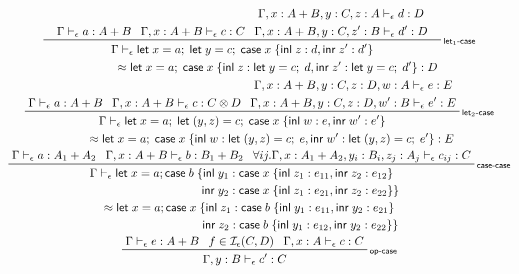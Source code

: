 \documentclass[acmsmall,screen,review]{acmart}
\newcommand{\mc}[1]{\ensuremath{\mathcal{#1}}}
\newcommand{\ms}[1]{\ensuremath{\mathsf{#1}}}
\newcommand{\lto}{:}
\newcommand{\linl}[1]{\ms{inl}\;{#1}}
\newcommand{\linr}[1]{\ms{inr}\;{#1}}
\newcommand{\letexpr}[3]{\ensuremath{\ms{let}\;#1 = #2;\;#3}}
\newcommand{\caseexpr}[5]{\ms{case}\;#1\;\{\linl{#2} \lto #3, \linr{#4} \lto #5\}}
\newcommand{\bhyp}[2]{#1 : #2}
\newcommand{\rle}[1]{{\scriptsize\textsf{#1}}}
\newcommand{\hasty}[4]{#1 \vdash_{#2} #3: {#4}}
\newcommand{\isop}[4]{#1 \in \mc{I}_{#4}(#2, #3)}
\newcommand{\teqv}{\approx}
\begin{document}
\begin{gather*}
  \prftree[r]{\rle{let$_1$-case}}
    {\hasty{\Gamma}{\epsilon}{a}{A + B}}
    {\hasty{\Gamma, \bhyp{x}{A + B}}{\epsilon}{c}{C}}
    {
      \prfStackPremises
      {\hasty{\Gamma, \bhyp{x}{A + B}, \bhyp{y}{C}, \bhyp{z}{A}}{\epsilon}{d}{D}}
      {\hasty{\Gamma, \bhyp{x}{A + B}, \bhyp{y}{C}, \bhyp{z'}{B}}{\epsilon}{d'}{D}}
    }
    {
      \prfStackPremises
      {\Gamma \vdash_\epsilon \letexpr{x}{a}{\letexpr{y}{c}{\caseexpr{x}{z}{d}{z'}{d'}}}}
      {\hspace{6em} \teqv \letexpr{x}{a}{\caseexpr{x}{z}{\letexpr{y}{c}{d}}{z'}{\letexpr{y}{c}{d'}}} 
      : D}
    }
  \\
  \prftree[r]{\rle{let$_2$-case}}
    {\hasty{\Gamma}{\epsilon}{a}{A + B}}
    {\hasty{\Gamma, \bhyp{x}{A + B}}{\epsilon}{c}{C \otimes D}}
    {
      \prfStackPremises
      {\hasty{\Gamma, \bhyp{x}{A + B}, \bhyp{y}{C}, \bhyp{z}{D}, \bhyp{w}{A}}{\epsilon}{e}{E}}
      {\hasty{\Gamma, \bhyp{x}{A + B}, \bhyp{y}{C}, \bhyp{z}{D}, \bhyp{w'}{B}}{\epsilon}{e'}{E}}
    }
    {
      \prfStackPremises
      {\Gamma \vdash_\epsilon \letexpr{x}{a}{\letexpr{(y, z)}{c}{\caseexpr{x}{w}{e}{w'}{e'}}}}
      {\hspace{5em} \teqv \letexpr{x}{a}
        {\caseexpr{x}
          {w}{\letexpr{(y, z)}{c}{e}}
          {w'}{\letexpr{(y, z)}{c}{e'}}} 
      : E}
    }
  \\
  \prftree[r]{\rle{case-case}}
    {\hasty{\Gamma}{\epsilon}{a}{A_1 + A_2}}
    {\hasty{\Gamma, \bhyp{x}{A + B}}{\epsilon}{b}{B_1 + B_2}}
    {
      \forall i j.
      \hasty{\Gamma, \bhyp{x}{A_1 + A_2}, \bhyp{y_i}{B_i}, \bhyp{z_j}{A_j}}{\epsilon}
            {c_{ij}}{C}
    }
    {
      \prfStackPremises
      {\Gamma \vdash_\epsilon 
        \ms{let}\;x = a;
        \ms{case}\;b\;\{\ms{inl}\;y_1 \lto \caseexpr{x}{z_1}{e_{11}}{z_2}{e_{12}}
      }
      {
        \hspace{10em} \ms{inr}\;y_2 \lto \caseexpr{x}{z_1}{e_{21}}{z_2}{e_{22}} \}
      }
      {\hspace{1.3em} \teqv
        \ms{let}\;x = a;
        \ms{case}\;x\;\{\ms{inl}\;z_1 \lto \caseexpr{b}{y_1}{e_{11}}{y_2}{e_{21}}
      }
      {
        \hspace{10em} \ms{inr}\;z_2 \lto \caseexpr{b}{y_1}{e_{12}}{y_2}{e_{22}} \}
      }
    }
  \\
  \prftree[r]{\rle{op-case}}
    {\hasty{\Gamma}{\epsilon}{e}{A + B}}
    {\isop{f}{C}{D}{\epsilon}}
    {\hasty{\Gamma, \bhyp{x}{A}}{\epsilon}{c}{C}}
    {\hasty{\Gamma, \bhyp{y}{B}}{\epsilon}{c'}{C}}

\end{gather*}
\end{document}
